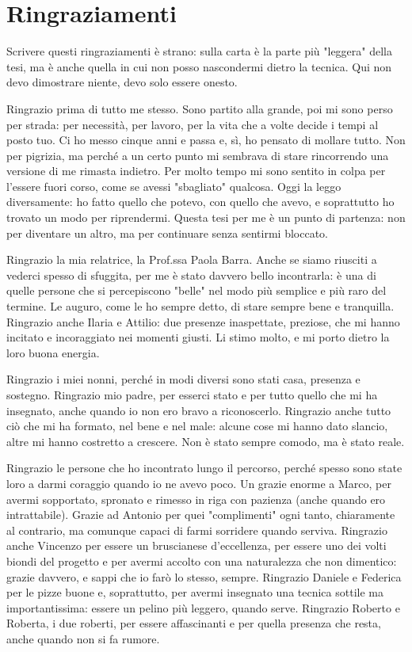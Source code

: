 \chapter*{Ringraziamenti}
\label{chap:ringraziamenti}

Scrivere questi ringraziamenti è strano: sulla carta è la parte più "leggera" della tesi, ma è anche quella in cui non posso nascondermi dietro la tecnica. Qui non devo dimostrare niente, devo solo essere onesto.

Ringrazio prima di tutto me stesso. Sono partito alla grande, poi mi sono perso per strada: per necessità, per lavoro, per la vita che a volte decide i tempi al posto tuo. Ci ho messo cinque anni e passa e, sì, ho pensato di mollare tutto. Non per pigrizia, ma perché a un certo punto mi sembrava di stare rincorrendo una versione di me rimasta indietro. Per molto tempo mi sono sentito in colpa per l'essere fuori corso, come se avessi "sbagliato" qualcosa. Oggi la leggo diversamente: ho fatto quello che potevo, con quello che avevo, e soprattutto ho trovato un modo per riprendermi. Questa tesi per me è un punto di partenza: non per diventare un altro, ma per continuare senza sentirmi bloccato.

Ringrazio la mia relatrice, la Prof.ssa Paola Barra. Anche se siamo riusciti a vederci spesso di sfuggita, per me è stato davvero bello incontrarla: è una di quelle persone che si percepiscono "belle" nel modo più semplice e più raro del termine. Le auguro, come le ho sempre detto, di stare sempre bene e tranquilla. Ringrazio anche Ilaria e Attilio: due presenze inaspettate, preziose, che mi hanno incitato e incoraggiato nei momenti giusti. Li stimo molto, e mi porto dietro la loro buona energia.

Ringrazio i miei nonni, perché in modi diversi sono stati casa, presenza e sostegno. Ringrazio mio padre, per esserci stato e per tutto quello che mi ha insegnato, anche quando io non ero bravo a riconoscerlo. Ringrazio anche tutto ciò che mi ha formato, nel bene e nel male: alcune cose mi hanno dato slancio, altre mi hanno costretto a crescere. Non è stato sempre comodo, ma è stato reale.

Ringrazio le persone che ho incontrato lungo il percorso, perché spesso sono state loro a darmi coraggio quando io ne avevo poco. Un grazie enorme a Marco, per avermi sopportato, spronato e rimesso in riga con pazienza (anche quando ero intrattabile). Grazie ad Antonio per quei "complimenti" ogni tanto, chiaramente al contrario, ma comunque capaci di farmi sorridere quando serviva. Ringrazio anche Vincenzo per essere un bruscianese d'eccellenza, per essere uno dei volti biondi del progetto e per avermi accolto con una naturalezza che non dimentico: grazie davvero, e sappi che io farò lo stesso, sempre. Ringrazio Daniele e Federica per le pizze buone e, soprattutto, per avermi insegnato una tecnica sottile ma importantissima: essere un pelino più leggero, quando serve. Ringrazio Roberto e Roberta, i due roberti, per essere affascinanti e per quella presenza che resta, anche quando non si fa rumore.


